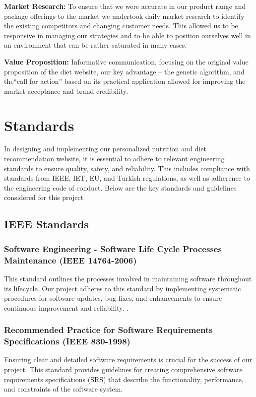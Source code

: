\documentclass[a4paper,12pt]{article}
\begin{document}
\textbf{Market Research:} To ensure that we were accurate in our product range and package offerings to the market we undertook daily market research to identify the existing competitors and changing customer needs. This allowed us to be responsive in managing our strategies and to be able to position ourselves well in an environment that can be rather saturated in many cases.

\noindent\textbf{Value Proposition:} Informative communication, focusing on the original value proposition of the diet website, our key advantage – the genetic algorithm, and the“call for action” based on its practical application allowed for improving the market acceptance and brand credibility.

\section{Standards}
In designing and implementing our personalized nutrition and diet recommendation website, it is essential to adhere to relevant engineering standards to ensure quality, safety, and reliability. This includes compliance with standards from IEEE, IET, EU, and Turkish regulations, as well as adherence to the engineering code of conduct. Below are the key standards and guidelines considered for this project
\subsection{IEEE Standards}
\subsubsection{Software Engineering - Software Life Cycle Processes Maintenance (IEEE 14764-2006)}

This standard outlines the processes involved in maintaining software throughout its lifecycle. Our project adheres to this standard by implementing systematic procedures for software updates, bug fixes, and enhancements to ensure continuous improvement and reliability. \cite{ieee14764}.


\subsubsection{Recommended Practice for Software Requirements Specifications (IEEE 830-1998)}
Ensuring clear and detailed software requirements is crucial for the success of our project. This standard provides guidelines for creating comprehensive software requirements specifications (SRS) that describe the functionality, performance, and constraints of the software system. \cite{ieee830}
\end{document}
